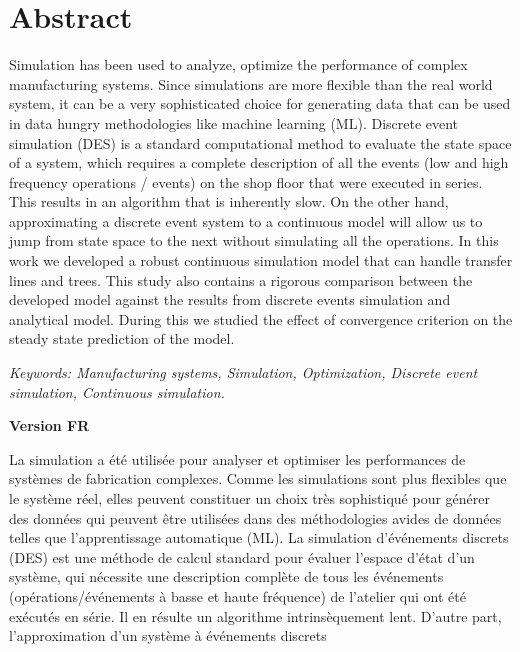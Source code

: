 \section{Abstract}
Simulation has been used to analyze, optimize the performance of complex manufacturing systems.
Since simulations are more flexible than the real world system, it can be a very sophisticated 
choice for generating data that can be used in data hungry methodologies like machine learning (ML). 
Discrete event simulation (DES) is a standard computational method to evaluate the state space of a system, 
which requires a complete description of all the events (low and high frequency operations / events)
on the shop floor that were executed in series. This results in an algorithm that is inherently slow. 
On the other hand, approximating a discrete event system to a continuous model will allow us to jump 
from state space to the next without simulating all the operations. In this work we developed a robust 
continuous simulation model that can handle transfer lines and trees. This study also contains a rigorous 
comparison between the developed model against the results from discrete events simulation and analytical model. 
During this we studied the effect of convergence criterion on the steady state prediction of the model.\par
\vspace{5pt}
\textit{Keywords: Manufacturing systems, Simulation, Optimization, Discrete event simulation, Continuous simulation.}\par 
\noindent\hrulefill \par
\vspace{5pt}
\vspace{5pt}
\textbf{Version FR} \par
\vspace{5pt}
La simulation a été utilisée pour analyser et optimiser les performances de systèmes de fabrication complexes.
Comme les simulations sont plus flexibles que le système réel, elles peuvent constituer un choix très 
sophistiqué pour générer des données qui peuvent être utilisées dans des méthodologies avides de données 
telles que l'apprentissage automatique (ML). La simulation d'événements discrets (DES) est une méthode de 
calcul standard pour évaluer l'espace d'état d'un système, qui nécessite une description complète de tous 
les événements (opérations/événements à basse et haute fréquence) de l'atelier qui ont été exécutés en série. 
Il en résulte un algorithme intrinsèquement lent. D'autre part, l'approximation d'un système à événements discrets 
